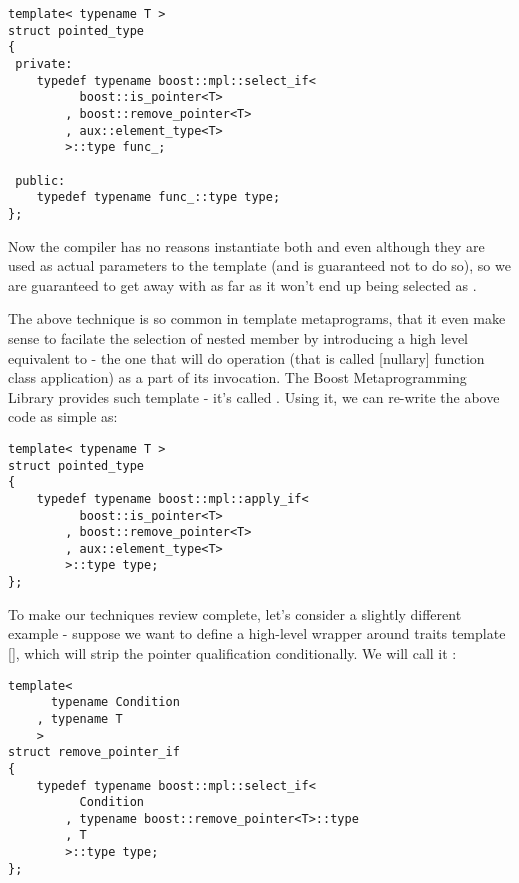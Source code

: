 \documentclass{netobjectdays}
\newcommand{\Mpl}{Boost Meta\-program\-ming Library}
\begin{document}
{\footnotesize
\begin{verbatim}
template< typename T >
struct pointed_type
{
 private:
    typedef typename boost::mpl::select_if<
          boost::is_pointer<T>
        , boost::remove_pointer<T>
        , aux::element_type<T>
        >::type func_;

 public:
    typedef typename func_::type type;
};
\end{verbatim}
}

Now the compiler has no reasons instantiate both 
 and 
 even although they are used as 
actual parameters to the  template (and is 
guaranteed not to do so), so we are guaranteed to get away with 
 as far as it won't end up being 
selected as .

The above technique is so common in template metaprograms, that it
even make sense to facilate the selection of nested  member
by introducing a high level equivalent to  - the one
that will do  operation (that is called [nullary]
function class application) as a part of its invocation.  The \Mpl
provides such template - it's called . Using it, we
can re-write the above code as simple as:

{\footnotesize
\begin{verbatim}
template< typename T >
struct pointed_type
{
    typedef typename boost::mpl::apply_if<
          boost::is_pointer<T>
        , boost::remove_pointer<T>
        , aux::element_type<T>
        >::type type;
};
\end{verbatim}
}

To make our techniques review complete, let's consider a slightly 
different example - suppose we want to define a high-level wrapper 
around  traits template [], which will 
strip the pointer qualification conditionally. We will call it 
:

{\footnotesize
\begin{verbatim}
template<
      typename Condition
    , typename T
    >
struct remove_pointer_if
{
    typedef typename boost::mpl::select_if<
          Condition
        , typename boost::remove_pointer<T>::type
        , T
        >::type type;
};
\end{verbatim}
}
\end{document}
